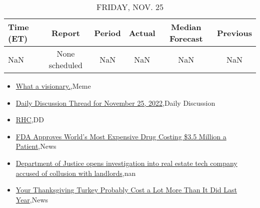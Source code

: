 \documentclass{article}%
\begin{document}
%


\begin{table}[htbp]%
\caption{FRIDAY, NOV. 25}%
\centering%
\begin{adjustbox}{width=1\textwidth}%
\begin{tabular}{lccccc}
\toprule
Time (ET) &         Report & Period & Actual & Median Forecast & Previous \\
\midrule
      NaN & None scheduled &    NaN &    NaN &             NaN &      NaN \\
\bottomrule
\end{tabular}
%
\end{adjustbox}%
\end{table}

%
\begin{itemize}%
\item%
\href{https://reddit.com/r/wallstreetbets/comments/z4cok1/what\_a\_visionary/}{What a visionary.},Meme%
\item%
\href{https://reddit.com/r/wallstreetbets/comments/z4amw3/daily\_discussion\_thread\_for\_november\_25\_2022/}{Daily Discussion Thread for November 25, 2022},Daily Discussion%
\item%
\href{https://reddit.com/r/Baystreetbets/comments/z3x972/rhc/}{RHC},DD%
\item%
\href{https://reddit.com/r/Economics/comments/z49rx8/fda\_approves\_worlds\_most\_expensive\_drug\_costing/}{FDA Approves World's Most Expensive Drug Costing \$3.5 Million a Patient},News%
\item%
\href{https://reddit.com/r/Economics/comments/z46f6l/department\_of\_justice\_opens\_investigation\_into/}{Department of Justice opens investigation into real estate tech company accused of collusion with landlords},nan%
\item%
\href{https://reddit.com/r/Economics/comments/z448c8/your\_thanksgiving\_turkey\_probably\_cost\_a\_lot\_more/}{Your Thanksgiving Turkey Probably Cost a Lot More Than It Did Last Year},News%
\end{itemize}%
\end{document}
